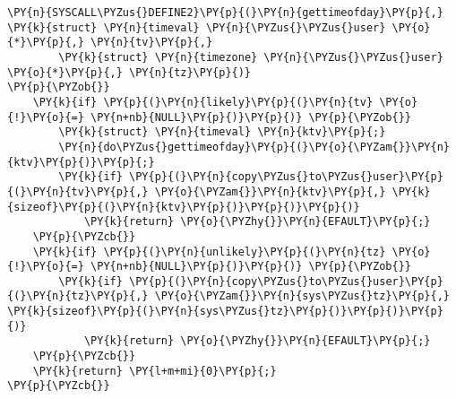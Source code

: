 \begin{Verbatim}[commandchars=\\\{\}]
\PY{n}{SYSCALL\PYZus{}DEFINE2}\PY{p}{(}\PY{n}{gettimeofday}\PY{p}{,} \PY{k}{struct} \PY{n}{timeval} \PY{n}{\PYZus{}\PYZus{}user} \PY{o}{*}\PY{p}{,} \PY{n}{tv}\PY{p}{,}
		\PY{k}{struct} \PY{n}{timezone} \PY{n}{\PYZus{}\PYZus{}user} \PY{o}{*}\PY{p}{,} \PY{n}{tz}\PY{p}{)}
\PY{p}{\PYZob{}}
	\PY{k}{if} \PY{p}{(}\PY{n}{likely}\PY{p}{(}\PY{n}{tv} \PY{o}{!}\PY{o}{=} \PY{n+nb}{NULL}\PY{p}{)}\PY{p}{)} \PY{p}{\PYZob{}}
		\PY{k}{struct} \PY{n}{timeval} \PY{n}{ktv}\PY{p}{;}
		\PY{n}{do\PYZus{}gettimeofday}\PY{p}{(}\PY{o}{\PYZam{}}\PY{n}{ktv}\PY{p}{)}\PY{p}{;}
		\PY{k}{if} \PY{p}{(}\PY{n}{copy\PYZus{}to\PYZus{}user}\PY{p}{(}\PY{n}{tv}\PY{p}{,} \PY{o}{\PYZam{}}\PY{n}{ktv}\PY{p}{,} \PY{k}{sizeof}\PY{p}{(}\PY{n}{ktv}\PY{p}{)}\PY{p}{)}\PY{p}{)}
			\PY{k}{return} \PY{o}{\PYZhy{}}\PY{n}{EFAULT}\PY{p}{;}
	\PY{p}{\PYZcb{}}
	\PY{k}{if} \PY{p}{(}\PY{n}{unlikely}\PY{p}{(}\PY{n}{tz} \PY{o}{!}\PY{o}{=} \PY{n+nb}{NULL}\PY{p}{)}\PY{p}{)} \PY{p}{\PYZob{}}
		\PY{k}{if} \PY{p}{(}\PY{n}{copy\PYZus{}to\PYZus{}user}\PY{p}{(}\PY{n}{tz}\PY{p}{,} \PY{o}{\PYZam{}}\PY{n}{sys\PYZus{}tz}\PY{p}{,} \PY{k}{sizeof}\PY{p}{(}\PY{n}{sys\PYZus{}tz}\PY{p}{)}\PY{p}{)}\PY{p}{)}
			\PY{k}{return} \PY{o}{\PYZhy{}}\PY{n}{EFAULT}\PY{p}{;}
	\PY{p}{\PYZcb{}}
	\PY{k}{return} \PY{l+m+mi}{0}\PY{p}{;}
\PY{p}{\PYZcb{}}
\end{Verbatim}
